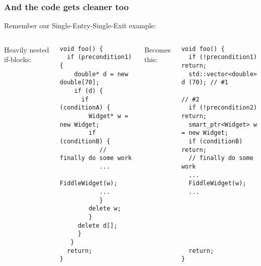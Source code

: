 \begin{frame}[fragile,t]
\frametitle{And the code gets cleaner too}

Remember our Single-Entry-Single-Exit example:

\begin{columns}[t]
Heavily nested if-blocks:
{\scriptsize\begin{verbatim}
void foo() {
  if (precondition1) {
    double* d = new double[70];
    if (d) {
      if (conditionA) {
        Widget* w = new Widget;
        if (conditionB) {
           // finally do some work
           ...
           FiddleWidget(w);
           ...
           }
        delete w;
        }
     delete d[];
     }
   }
  return;
}
\end{verbatim}}
\pause{}
Becomes this:
{\scriptsize\begin{verbatim}
void foo() {
  if (!precondition1)  return;
  std::vector<double> d (70); // #1
                              // #2
  if (!precondition2) return;
  smart_ptr<Widget> w = new Widget;
  if (conditionB) return;
  // finally do some work
  ...
  FiddleWidget(w);
  ...






  return;
}
\end{verbatim}}
\end{columns}
\pause{}
\end{frame}
